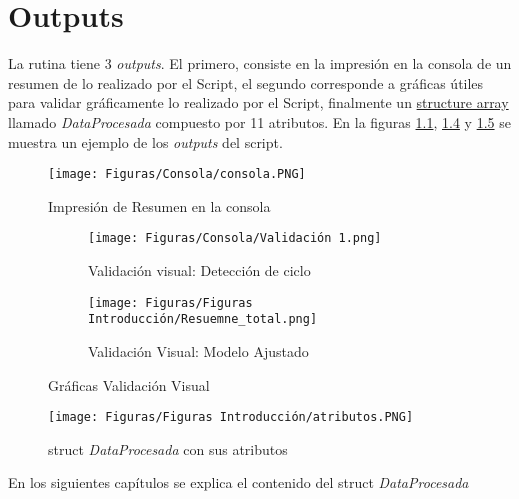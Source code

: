 \documentclass[a4paper, 11pt,article,oneside]{memoir}%
\begin{document}
\chapter{Outputs}
La rutina tiene 3 \textit{outputs}. El primero, consiste en la impresión en la consola de un  resumen de lo realizado por el Script, el segundo corresponde a gráficas útiles para validar gráficamente lo realizado por el Script, finalmente un   \href{https://www.mathworks.com/help/matlab/ref/struct.html}{structure array} llamado \textit{DataProcesada} compuesto por 11 atributos. En la figuras \ref{fig:first resumen}, \ref{fig:Validación Visual} y \ref{fig:atributes } se muestra un ejemplo de los \textit{outputs} del script.
\begin{figure}[h!]
    \centering
    \texttt{[image: Figuras/Consola/consola.PNG]}
    \caption{Impresión de Resumen en la consola}
    \label{fig:first resumen}
\end{figure}





\begin{figure}[h!]
    \centering
    \begin{subfigure}{0.45\textwidth}
   \texttt{[image: Figuras/Consola/Validación 1.png]}
    \caption{Validación visual: Detección de ciclo}
    \label{fig:Validación 1}
\end{subfigure}
\hfill
\begin{subfigure}{0.45\textwidth}
   \texttt{[image: Figuras/Figuras Introducción/Resuemne\_total.png]}
    \caption{Validación Visual: Modelo Ajustado}
    \label{fig:second}
\end{subfigure}
\caption{ Gráficas Validación Visual}
\label{fig:Validación Visual}
\end{figure}
\begin{figure}[h!]
    \centering
    \texttt{[image: Figuras/Figuras Introducción/atributos.PNG]}
    \caption{struct \textit{DataProcesada} con sus atributos}
    \label{fig:atributes }
\end{figure}
En los siguientes capítulos se explica el contenido del struct \textit{DataProcesada}
 \newpage
\end{document}
